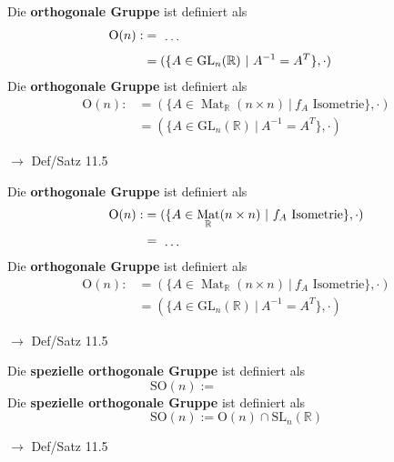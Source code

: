 \documentclass[11pt]{article}
\renewcommand{\cite}[1]{\par\bigskip\hfill{\color{gray}\tiny\(\to\) #1}}
\newcommand{\RR}{\mathbb{R}}
\DeclareMathOperator{\Mat}{Mat}
\newcommand{\hide}[1]{\parbox{0cm}{\raisebox{-7pt}[0cm]{\dots}}\color{white}#1\color{black}}
\let\olddots\dots
\renewcommand{\dots}{\,\olddots\,}
\newenvironment{field}{}{\newpage}
\newif\ifnote
\newenvironment{note}{\notetrue}{\notefalse}
\newcommand{\localtag}{}
\newcommand{\globaltag}{}
\newcommand{\uuid}{}
\newcommand{\tags}[1]{
    \ifnote
        \renewcommand{\localtag}{#1}
    \else
        \renewcommand{\globaltag}{#1}
    \fi
    }
\newcommand{\xplain}[1]{\renewcommand{\uuid}{#1}}
\begin{document}
\begin{note}
    \tags{Def Satz}
    \xplain{9a5ba794-c30d-11ec-9d64-0242ac120002}
    \begin{field}
        Die \textbf{orthogonale Gruppe} ist definiert als
        \begin{align*}
            \text{O}(n) :&= \hide{(\{A\in\Mat_{\RR}(n\times n) \ \vert \ f_A \text{ Isometrie}\}, \cdot)}\\
            &= (\{A \in \text{GL}_n(\RR) \ \vert \ A^{-1} = A^T\}, \cdot)
        \end{align*}
    \end{field}
    \begin{field}
        Die \textbf{orthogonale Gruppe} ist definiert als
        \begin{align*}
            \text{O}(n) :&= (\{A\in\Mat_{\RR}(n\times n) \ \vert \ f_A \text{ Isometrie}\}, \cdot)\\
            &= (\{A \in \text{GL}_n(\RR) \ \vert \ A^{-1} = A^T\}, \cdot)
        \end{align*}
        \cite{Def/Satz 11.5}
    \end{field}

    \begin{field}
        Die \textbf{orthogonale Gruppe} ist definiert als
        \begin{align*}
            \text{O}(n) :&= (\{A\in\Mat_{\RR}(n\times n) \ \vert \ f_A \text{ Isometrie}\}, \cdot)\\
            &= \hide{(\{A \in \text{GL}_n(\RR) \ \vert \ A^{-1} = A^T\}, \cdot)}
        \end{align*}
    \end{field}
    \begin{field}
        Die \textbf{orthogonale Gruppe} ist definiert als
        \begin{align*}
            \text{O}(n) :&= (\{A\in\Mat_{\RR}(n\times n) \ \vert \ f_A \text{ Isometrie}\}, \cdot)\\
            &= (\{A \in \text{GL}_n(\RR) \ \vert \ A^{-1} = A^T\}, \cdot)
        \end{align*}
        \cite{Def/Satz 11.5}
    \end{field}

    \begin{field}
        Die \textbf{spezielle orthogonale Gruppe} ist definiert als
        \[\text{SO}(n) := \phantom{\text{O}(n) \cap \text{SL}_n(\RR)}\]
    \end{field}
    \begin{field}
        Die \textbf{spezielle orthogonale Gruppe} ist definiert als
        \[\text{SO}(n) := \text{O}(n) \cap \text{SL}_n(\RR)\]
        \cite{Def/Satz 11.5}
    \end{field}
\end{note}
\end{document}
